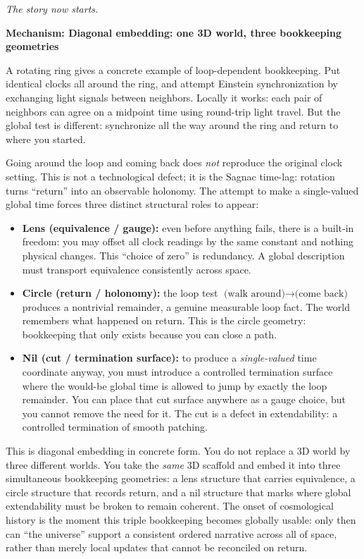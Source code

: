 \documentclass[11pt,twoside,openright]{book}
\newenvironment{mechanismbox}[1]
  {\begin{framed}\noindent\textbf{Mechanism: #1}\par\medskip}
  {\end{framed}}
\begin{document}
\emph{The story now starts.}
\begin{mechanismbox}{Diagonal embedding: one 3D world, three bookkeeping geometries}
A rotating ring gives a concrete example of loop-dependent bookkeeping. Put identical clocks all around the ring, and attempt Einstein synchronization by exchanging light signals between neighbors. Locally it works: each pair of neighbors can agree on a midpoint time using round-trip light travel. But the global test is different: synchronize all the way around the ring and return to where you started.

Going around the loop and coming back does \emph{not} reproduce the original clock setting. This is not a technological defect; it is the Sagnac time-lag: rotation turns ``return'' into an observable holonomy. The attempt to make a single-valued global time forces three distinct structural roles to appear:

\begin{itemize}
\item \textbf{Lens (equivalence / gauge):} even before anything fails, there is a built-in freedom: you may offset all clock readings by the same constant and nothing physical changes. This ``choice of zero'' is redundancy. A global description must transport equivalence consistently across space.
\item \textbf{Circle (return / holonomy):} the loop test $\text{(walk around)}\rightarrow\text{(come back)}$ produces a nontrivial remainder, a genuine measurable loop fact. The world remembers what happened on return. This is the circle geometry: bookkeeping that only exists because you can close a path.
\item \textbf{Nil (cut / termination surface):} to produce a \emph{single-valued} time coordinate anyway, you must introduce a controlled termination surface where the would-be global time is allowed to jump by exactly the loop remainder. You can place that cut surface anywhere as a gauge choice, but you cannot remove the need for it. The cut is a defect in extendability: a controlled termination of smooth patching.
\end{itemize}

This is diagonal embedding in concrete form. You do not replace a 3D world by three different worlds. You take the \emph{same} 3D scaffold and embed it into three simultaneous bookkeeping geometries: a lens structure that carries equivalence, a circle structure that records return, and a nil structure that marks where global extendability must be broken to remain coherent. The onset of cosmological history is the moment this triple bookkeeping becomes globally usable: only then can ``the universe'' support a consistent ordered narrative across all of space, rather than merely local updates that cannot be reconciled on return.
\end{mechanismbox}
\end{document}
